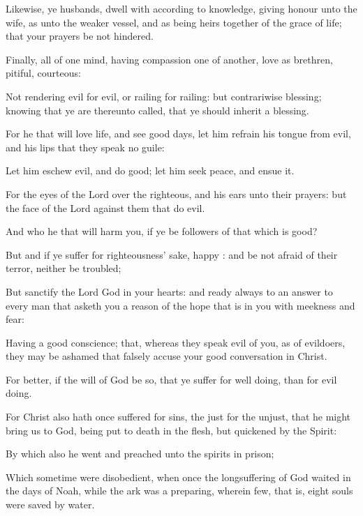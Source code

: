 {Likewise, ye
husbands, dwell
with
{} according
to
knowledge,
giving
honour unto the
wife,
as unto the
weaker
vessel,
and
as being heirs
together of the
grace of
life;
that
your
prayers
be
not
hindered.

Finally,
{}
all of one
mind, having compassion one of
another, love as
brethren,
{}
pitiful,
{}
courteous:

Not
rendering
evil
for
evil,
or
railing
for
railing:
but
contrariwise
blessing;
knowing
that ye
are
thereunto
called,
that ye should
inherit a
blessing.

For he that
will
love
life,
and
see
good
days, let him
refrain
his
tongue
from
evil,
and
his
lips that they
speak
no
guile:

Let him
eschew
evil,
and
do
good; let him
seek
peace,
and
ensue
it.

For the
eyes of the
Lord
{}
over the
righteous,
and
his
ears
{}
unto
their
prayers:
but the
face of the
Lord
{}
against them that
do
evil.


\par }{\PP {}And
who
{} he that will
harm
you,
if ye
be
followers of that which is
good?

But
and
if ye
suffer
for
righteousness’ sake,
happy
{}:
and
be
not
afraid of
their
terror,
neither be
troubled;

But
sanctify the
Lord
God
in
your
hearts:
and
{}
ready
always
to
{} an
answer to every
man that
asketh
you a
reason
of the
hope
that is
in
you
with
meekness
and
fear:

Having a
good
conscience;
that,
whereas they speak
evil of
you,
as of
evildoers, they may be
ashamed that falsely
accuse
your
good
conversation
in
Christ.

For
{}
better,
if the
will of
God be
so, that ye
suffer for well
doing,
than for evil
doing.

For
Christ
also
hath
once
suffered
for
sins, the
just
for the
unjust,
that he might
bring
us to
God, being put to
death in the
flesh,
but
quickened by the
Spirit:

By
which
also he
went and
preached unto the
spirits
in
prison;

Which
sometime were
disobedient,
when
once the
longsuffering of
God
waited
in the
days of
Noah, while the
ark was a
preparing,
wherein
few,
that
is,
eight
souls were
saved
by
water.

}
